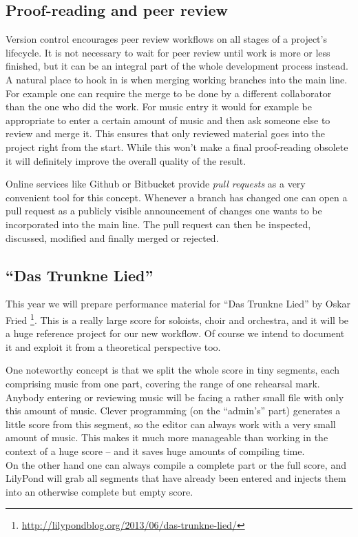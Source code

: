 \documentclass[11pt,a4paper]{article}
\begin{document}
\subsection{Proof-reading and peer review}\label{sec:proof-reading-and-peer-review}
Version control encourages peer review workflows on all stages of a project's lifecycle.
It is not necessary to wait for peer review until work is more or less finished, but it
can be an integral part of the whole development process instead. A natural place to hook
in is when merging working branches into the main line. For example one can require the
merge to be done by a different collaborator than the one who did the work. For music entry
it would for example be appropriate to enter a certain amount of music and then ask someone
else to review and merge it.
This ensures that only reviewed material goes into the project right from the
start. While this won't make a final proof-reading obsolete it will definitely improve
the overall quality of the result.

Online services like Github or Bitbucket provide \emph{pull requests} as a very convenient
tool for this concept. Whenever a branch has changed one can open a pull request as a
publicly visible announcement of changes one wants to be incorporated into the main line.
The pull request can then be inspected, discussed, modified and finally merged or rejected.

\subsection{“Das Trunkne Lied”}
This year we will prepare performance material for “Das Trunkne Lied” by Oskar Fried%
\footnote{\url{http://lilypondblog.org/2013/06/das-trunkne-lied/}}.
This is a really large score for soloists, choir and orchestra, and it will be a
huge reference project for our new workflow. Of course we intend to document it
and exploit it from a theoretical perspective too.

One noteworthy concept is that we split the whole score in tiny segments, each comprising
music from one part, covering the range of one rehearsal mark. Anybody entering or
reviewing music will be facing a rather small file with only this amount of music.
Clever programming (on the “admin's” part) generates a little score from this segment, so
the editor can always work with a very small amount of music. This makes it much more
manageable than working in the context of a huge score -- and it saves huge amounts of
compiling time.\\
On the other hand one can always compile a complete part or the full score, and LilyPond
will grab all segments that have already been entered and injects them into an otherwise
complete but empty score.
\end{document}
